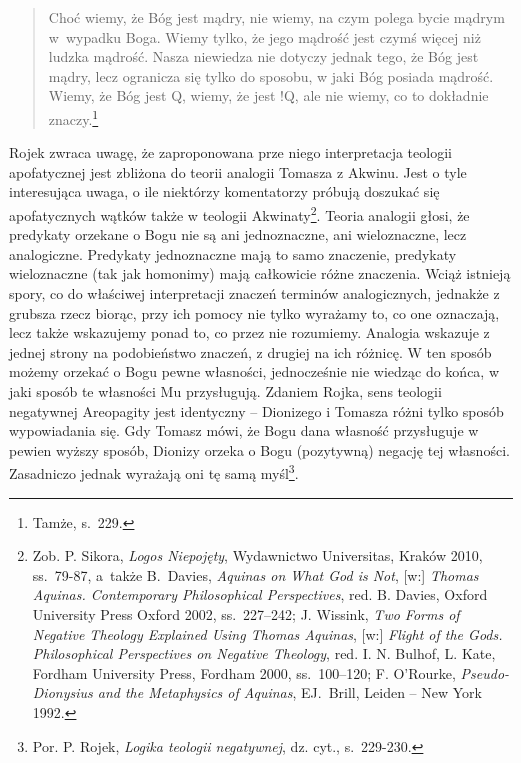 \begin{quote}
    Choć wiemy, że Bóg jest mądry, nie wiemy, na czym polega bycie mądrym
    w~wypadku Boga. Wiemy tylko, że jego mądrość jest czymś więcej niż ludzka
mądrość. Nasza niewiedza nie dotyczy jednak tego, że Bóg jest mądry,
lecz ogranicza się tylko do sposobu, w jaki Bóg posiada mądrość. Wiemy,
że Bóg jest Q, wiemy, że jest !Q, ale nie wiemy, co to dokładnie
znaczy.\footnote{Tamże, s.~229. }
\end{quote}





Rojek zwraca uwagę, że zaproponowana prze niego interpretacja teologii
apofatycznej jest zbliżona do 
teorii analogii Tomasza z Akwinu. Jest o tyle interesująca uwaga, o ile niektórzy
komentatorzy próbują doszukać się apofatycznych wątków także w teologii
Akwinaty\footnote{Zob. P. Sikora, \textit{Logos Niepojęty}, Wydawnictwo Universitas, Kraków 2010, ss.~79-87,
a~także B.~Davies, \textit{Aquinas on What God is Not}, [w:]  \textit{Thomas
Aquinas. Contemporary Philosophical Perspectives}, red. B. Davies, Oxford University
Press Oxford 2002, ss.~227–242; J. Wissink, \textit{Two Forms of Negative
Theology Explained Using Thomas Aquinas}, [w:]  \textit{Flight of the Gods. Philosophical Perspectives on Negative
Theology}, red. I. N. Bulhof, L.
Kate, Fordham University Press, Fordham 2000, ss.~100--120; F.
O'Rourke, \textit{Pseudo-Dionysius and the Metaphysics of
Aquinas}, EJ.~Brill, Leiden -- New York 1992. }. Teoria analogii
głosi, że predykaty orzekane o Bogu nie są ani jednoznaczne, ani
wieloznaczne, lecz analogiczne. Predykaty jednoznaczne mają to samo
znaczenie, predykaty wieloznaczne (tak jak homonimy) mają całkowicie
różne znaczenia. Wciąż istnieją spory, co do właściwej interpretacji
znaczeń terminów analogicznych, jednakże z grubsza  rzecz biorąc, przy
ich pomocy nie tylko wyrażamy to, co one oznaczają, lecz także
wskazujemy ponad to, co przez nie rozumiemy. Analogia wskazuje z jednej strony
na podobieństwo znaczeń, z drugiej na ich różnicę.
W ten sposób możemy
orzekać o Bogu pewne własności, jednocześnie nie wiedząc do końca, w
jaki sposób te własności Mu przysługują. Zdaniem Rojka, sens teologii
negatywnej Areopagity jest identyczny -- Dionizego i Tomasza różni tylko
sposób wypowiadania się. Gdy Tomasz mówi, że Bogu dana własność
przysługuje w pewien wyższy sposób, Dionizy orzeka o Bogu (pozytywną)
negację tej własności. Zasadniczo jednak wyrażają oni tę samą
myśl\footnote{Por. P. Rojek, \textit{Logika teologii negatywnej}, dz. cyt., s.~229-230.}.



